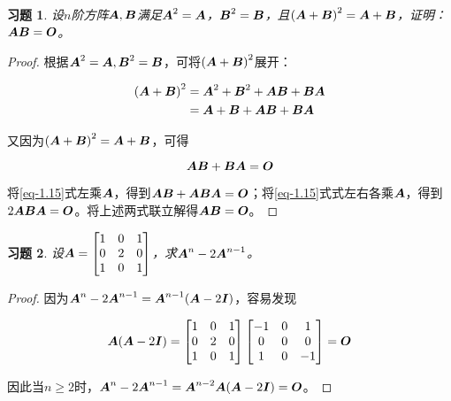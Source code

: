 \documentclass{ctexart}
\newtheorem{problem}{习题}[section]
\begin{document}
\begin{problem}
设\(n\)阶方阵\(\mata,\matb\)满足\(\mata^2=\mata\)，\(\matb^2=\matb\)，且\(\mypar{\mata+\matb}^2=\mata+\matb\)，证明：\(\mata\matb=\mato\)。
\end{problem}
\begin{proof}
    根据\(\mata^2=\mata,\matb^2=\matb\)，可将\(\mypar{\mata+\matb}^2\)展开：

    \begin{align*}
        \mypar{\mata+\matb}^2 & =\mata^2+\matb^2+\mata\matb+\matb\mata \\
                              & =\mata+\matb+\mata\matb+\matb\mata
    \end{align*}

    又因为\(\mypar{\mata+\matb}^2=\mata+\matb\)，可得

    \begin{equation}\label{eq-1.15}
        \mata\matb+\matb\mata=\mato
    \end{equation}

    将\eqref{eq-1.15}式左乘\(\mata\)，得到\(\mata\matb+\mata\matb\mata=\mato\)；将\eqref{eq-1.15}式式左右各乘\(\mata\)，得到\(2\mata\matb\mata=\mato\)。将上述两式联立解得\(\mata\matb=\mato\)。
\end{proof}

\begin{problem}
设\(\mata=\begin{bmatrix}1&0&1\\0&2&0\\1&0&1\end{bmatrix}\)，求\(\mata^n-2\mata^{n-1}\)。
\end{problem}
\begin{proof}
    因为\(\mata^n-2\mata^{n-1}=\mata^{n-1}(\mata-2\mati)\)，容易发现

    \begin{equation*}
        \mata(\mata-2\mati)=
        \begin{bmatrix}
            1 & 0 & 1 \\0&2&0\\1&0&1
        \end{bmatrix}
        \begin{bmatrix}
            -1 & 0 & 1 \\0&0&0\\1&0&-1
        \end{bmatrix}=\mato
    \end{equation*}

    因此当\(n\ge2\)时，\(\mata^n-2\mata^{n-1}=\mata^{n-2}\mata(\mata-2\mati)=\mato\)。
\end{proof}
\end{document}
